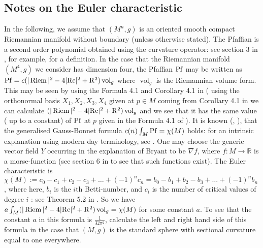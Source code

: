 \documentclass{amsart}
\numberwithin{equation}{section}
\theoremstyle{definition}
\theoremstyle{remark}
\begin{document}
\begin{appendix}
\section{Notes on the Euler characteristic}\label{gaussbonnet}
In the following, we assume that $(M^n,g)$ is an oriented smooth compact
Riemannian manifold
without boundary (unless otherwise stated).
The Pfaffian is a second order polynomial obtained using the curvature
operator: see section 3 in \cite{BG}, for example, for a
definition. In the case that the Riemannian manifold $(M^4,g)$ we
consider has dimension four, the Pfaffian ${{\rm{Pf}}}$ may be written as 
${{\rm{Pf}}} = c(|\operatorname{Riem}|^2 -4 |{{\rm{Rc}}}|^2 + {{\rm R}}^2 )\operatorname{vol}_g $ where $\operatorname{vol}_g$ is the
Riemannian volume form. This may be seen by using the Formula 4.1
and Corollary 4.1 in \cite{BG}  ( using the orthonormal basis
$X_1,X_2,X_3,X_4$ given at $p \in M$ coming from Corollary 4.1 in
\cite{BG} we can calculate $(|\operatorname{Riem}|^2 -4 |{{\rm{Rc}}}|^2
+ {{\rm R}}^2) \operatorname{vol}_g$  and we see that it has the same value ( up to a constant)
of ${{\rm{Pf}}}$ at $p$ given in the Formula 4.1 of \cite{BG} ).
It is known (\cite{AW}, \cite{Chern}), 
that the generalised Gauss-Bonnet formula $c(n) \int_M {{\rm{Pf}}} = 
{\chi}(M)$ holds: for an intrinsic explanation using  modern day
terminology, see \cite{Br}. One may choose the generic vector field
$Y$ occurring in the explanation of Bryant to be ${\nabla} f$, where $f:
M \to {\mathbb R}$ is a morse-function (see section 6 in \cite{Mi} to see that
such functions exist). The Euler characteristic is 
${\chi}(M):= c_0 -c_1 + c_2-c_3 + \ldots +(-1)^{n}c_n = b_0
-b_1+b_2-b_3 + \ldots + (-1)^n b_n$ , where here, $b_i$ is the $i$th
Betti-number, and $c_i$ is the number of critical values of degree $i$
: see Theorem 5.2 in \cite{Mi}.
So we have $ a \int_M  (|\operatorname{Riem}|^2 -4 |{{\rm{Rc}}}|^2 + {{\rm R}}^2 ) \operatorname{vol}_g=
{\chi}(M)$ for some constant $a$. To see that the constant $a$ in this
formula is $\frac{1}{32 \pi^2}$,
calculate  the left and right hand side of this formula in the case that $(M,g)$ is
the standard sphere with sectional curvature equal to one everywhere.
\end{appendix}
\end{document}
